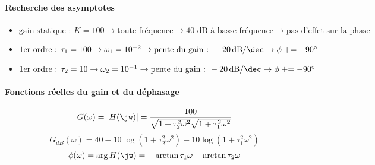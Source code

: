 \paragraph{Recherche des asymptotes}
\begin{itemize}
\item $\textrm{gain statique : } K=100      \rightarrow 
     \textrm{toute fréquence}           \rightarrow 
     \textrm{40 dB à basse fréquence}   \rightarrow 
     \textrm{pas d'effet sur la phase}$
\item $\textrm{1er ordre : }\tau_1=100     \rightarrow 
     \omega_1=10^{-2}                   \rightarrow 
     \textrm{pente du gain : } 
     \SI[per-mode=symbol]{-20}{\dB\per\dec}  \rightarrow 
     \phi\mathrel{+}=-90\si{\degree}$ 
\item $ \textrm{1er ordre : }\tau_2=10     \rightarrow 
     \omega_2=10^{-1}                   \rightarrow 
     \textrm{pente du gain : } 
     \SI[per-mode=symbol]{-20}{\dB\per\dec} \rightarrow 
     \phi\mathrel{+}=-90\si{\degree}$ 
\end{itemize}
\begin{center}
    

    
\end{center}
\paragraph{Fonctions réelles du gain et du déphasage}
\[
G(\omega)=|H(\jw)|=
\dfrac{100}{\sqrt{1+\tau_2^2\omega^2}\sqrt{1+\tau_1^2\omega^2}}
\]
\[
G_{dB}(\omega)=40-10\log{(1+\tau_2^2\omega^2)}-10\log{(1+\tau_1^2\omega^2)}
\]
\[
\phi(\omega)=\arg{H(\jw)}=-\arctan{\tau_1\omega}-\arctan{\tau_2\omega}
\]
